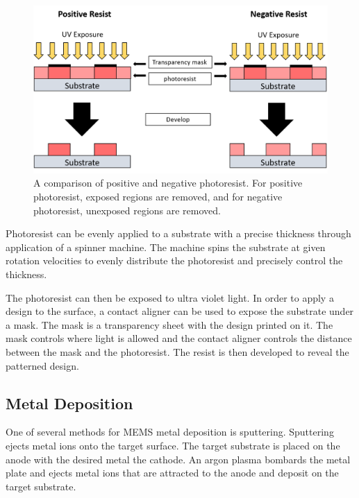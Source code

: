  \begin{figure}[h]
     \centering
     \includegraphics[width=\textwidth]{images/negative_vs_positive_resist.png}
     \caption[A comparison of positive and negative photoresist]{A comparison of positive and negative photoresist. For positive photoresist, exposed regions are removed, and for negative photoresist, unexposed regions are removed.}
     \label{fig:negative_vs_positive_resist}
 \end{figure}
 
 \par Photoresist can be evenly applied to a substrate with a precise thickness through application of a spinner machine. The machine spins the substrate at given rotation velocities to evenly distribute the photoresist and precisely control the thickness. 
 
 \par The photoresist can then be exposed to ultra violet light. In order to apply a design to the surface, a contact aligner can be used to expose the substrate under a mask. The mask is a transparency sheet with the design printed on it. The mask controls where light is allowed and the contact aligner controls the distance between the mask and the photoresist. The resist is then developed to reveal the patterned design. 
 
 \subsection*{Metal Deposition}
 
 \par One of several methods for MEMS metal deposition is sputtering. Sputtering ejects metal ions onto the target surface. The target substrate is placed on the anode with the desired metal the cathode. An argon plasma bombards the metal plate and ejects metal ions that are attracted to the anode and deposit on the target substrate. 
 
